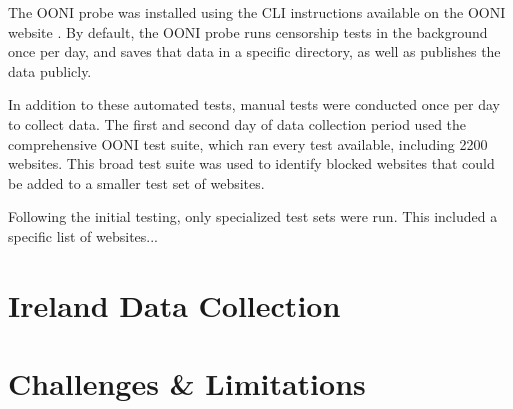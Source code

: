 The OONI probe was installed using the CLI instructions available on the OONI website \cite{OONISCLI}. By default, the OONI probe runs censorship tests in the background once per day, and saves that data in a specific directory, as well as publishes the data publicly. 

In addition to these automated tests, manual tests were conducted once per day to collect data. The first and second day of data collection period used the comprehensive OONI test suite, which ran every test available, including 2200 websites. This broad test suite was used to identify blocked websites that could be added to a smaller test set of websites.

Following the initial testing, only specialized test sets were run. This included a specific list of websites...

\section{Ireland Data Collection}

\section{Challenges \& Limitations}


